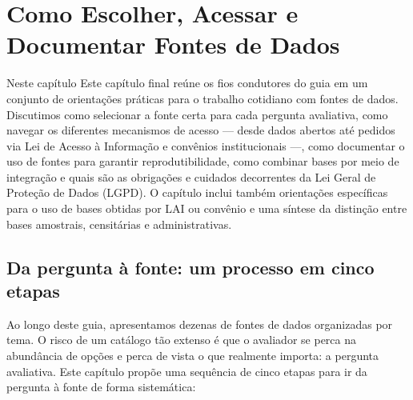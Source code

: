 
\chapter{Como Escolher, Acessar e Documentar Fontes de Dados}

\begin{boxdestaque}{Neste capítulo}
Este capítulo final reúne os fios condutores do guia em um conjunto de orientações práticas para o trabalho cotidiano com fontes de dados. Discutimos como selecionar a fonte certa para cada pergunta avaliativa, como navegar os diferentes mecanismos de acesso --- desde dados abertos até pedidos via Lei de Acesso à Informação e convênios institucionais ---, como documentar o uso de fontes para garantir reprodutibilidade, como combinar bases por meio de integração e quais são as obrigações e cuidados decorrentes da Lei Geral de Proteção de Dados (LGPD). O capítulo inclui também orientações específicas para o uso de bases obtidas por LAI ou convênio e uma síntese da distinção entre bases amostrais, censitárias e administrativas.
\end{boxdestaque}

\section{Da pergunta à fonte: um processo em cinco etapas}

Ao longo deste guia, apresentamos dezenas de fontes de dados organizadas por tema. O risco de um catálogo tão extenso é que o avaliador se perca na abundância de opções e perca de vista o que realmente importa: a pergunta avaliativa. Este capítulo propõe uma sequência de cinco etapas para ir da pergunta à fonte de forma sistemática:

